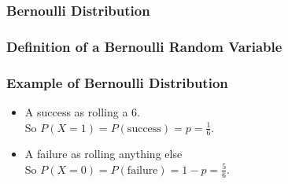 \documentclass[handout]{beamer}
\newcommand{\blue}[1]{\textcolor{blue2}{#1}}
\begin{document}
\begin{frame}
\frametitle{Bernoulli Distribution}

%
%
%
%


\end{frame}


\begin{frame}[fragile]
\frametitle{Definition of a Bernoulli Random Variable}

%
%
%

\end{frame}


\begin{frame}[fragile]
\frametitle{Example of Bernoulli Distribution}

\begin{itemize}
\item A success as rolling a 6.\\
So $P(X=1) = P(\mbox{success}) = p =  \frac{1}{6}$.
\item A failure as rolling anything else\\
So $P(X=0) = P(\mbox{failure}) = 1-p = \frac{5}{6}$.
\end{itemize}

\end{frame}
\end{document}
